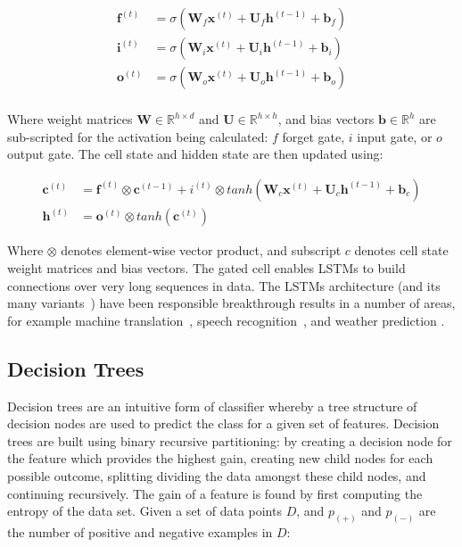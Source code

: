 \begin{align}
  \bm{f}^{(t)} &= \sigma \left( \bm{W}_f \bm{x}^{(t)} + \bm{U}_f \bm{h}^{(t-1)} + \bm{b}_f \right) \\
  \bm{i}^{(t)} &= \sigma \left( \bm{W}_i \bm{x}^{(t)} + \bm{U}_i \bm{h}^{(t-1)} + \bm{b}_i \right) \\
  \bm{o}^{(t)} &= \sigma \left( \bm{W}_o \bm{x}^{(t)} + \bm{U}_o \bm{h}^{(t-1)} + \bm{b}_o \right) \\
\end{align}

Where weight matrices $\bm{W} \in \mathbb{R}^{h\times d}$ and $\bm{U} \in \mathbb{R}^{h\times h}$, and bias vectors $\bm{b} \in \mathbb{R}^h$ are sub-scripted for the activation being calculated: $f$ forget gate, $i$ input gate, or $o$ output gate. The cell state and hidden state are then updated using:

\begin{align}
  \bm{c}^{(t)} &= \bm{f}^{(t)} \otimes \bm{c}^{(t-1)} + i^{(t)} \otimes tanh \left( \bm{W}_c \bm{x}^{(t)} + \bm{U}_c \bm{h}^{(t-1)} + \bm{b}_c \right) \\
  \bm{h}^{(t)} &= \bm{o}^{(t)} \otimes tanh ( \bm{c} ^{(t)} )
\end{align}

Where $\otimes$ denotes element-wise vector product, and subscript $c$ denotes cell state weight matrices and bias vectors. The gated cell enables LSTMs to build connections over very long sequences in data. The LSTMs architecture (and its many variants~\cite{Greff2015}) have been responsible breakthrough results in a number of areas, for example machine translation~\cite{Sutskever2014}, speech recognition~\cite{Graves2005}, and weather prediction \cite{Shi2015a}.


\subsection{Decision Trees}

Decision trees are an intuitive form of classifier whereby a tree structure of decision nodes are used to predict the class for a given set of features. Decision trees are built using binary recursive partitioning: by creating a decision node for the feature which provides the highest gain, creating new child nodes for each possible outcome, splitting dividing the data amongst these child nodes, and continuing recursively. The gain of a feature is found by first computing the entropy of the data set. Given a set of data points $D$, and $p_{(+)}$ and $p_{(-)}$ are the number of positive and negative examples in $D$:

